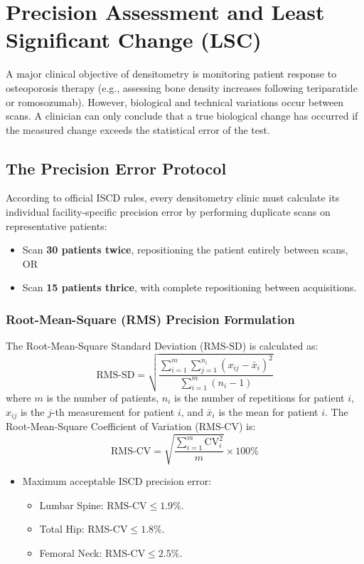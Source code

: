 \documentclass[11pt,a4paper]{article}
\begin{document}
\newpage
\section{Precision Assessment and Least Significant Change (LSC)}

A major clinical objective of densitometry is monitoring patient response to osteoporosis therapy (e.g., assessing bone density increases following teriparatide or romosozumab). However, biological and technical variations occur between scans. A clinician can only conclude that a true biological change has occurred if the measured change exceeds the statistical error of the test.

\subsection{The Precision Error Protocol}

According to official ISCD rules, every densitometry clinic must calculate its individual facility-specific precision error by performing duplicate scans on representative patients:
\begin{itemize}[leftmargin=*]
    \item Scan \textbf{30 patients twice}, repositioning the patient entirely between scans, OR
    \item Scan \textbf{15 patients thrice}, with complete repositioning between acquisitions.
\end{itemize}

\subsubsection{Root-Mean-Square (RMS) Precision Formulation}
The Root-Mean-Square Standard Deviation ($\text{RMS-SD}$) is calculated as:
\begin{equation}
    \text{RMS-SD} = \sqrt{\frac{\sum_{i=1}^{m} \sum_{j=1}^{n_i} (x_{ij} - \bar{x}_i)^2}{\sum_{i=1}^{m} (n_i - 1)}}
\end{equation}
where $m$ is the number of patients, $n_i$ is the number of repetitions for patient $i$, $x_{ij}$ is the $j$-th measurement for patient $i$, and $\bar{x}_i$ is the mean for patient $i$.
The Root-Mean-Square Coefficient of Variation ($\text{RMS-CV}$) is:
\begin{equation}
    \text{RMS-CV} = \sqrt{\frac{\sum_{i=1}^{m} \text{CV}_i^2}{m}} \times 100\%
\end{equation}
\begin{itemize}[leftmargin=*]
    \item Maximum acceptable ISCD precision error:
    \begin{itemize}
        \item Lumbar Spine: $\text{RMS-CV} \le 1.9\%$.
        \item Total Hip: $\text{RMS-CV} \le 1.8\%$.
        \item Femoral Neck: $\text{RMS-CV} \le 2.5\%$.
    \end{itemize}
\end{itemize}
\end{document}
